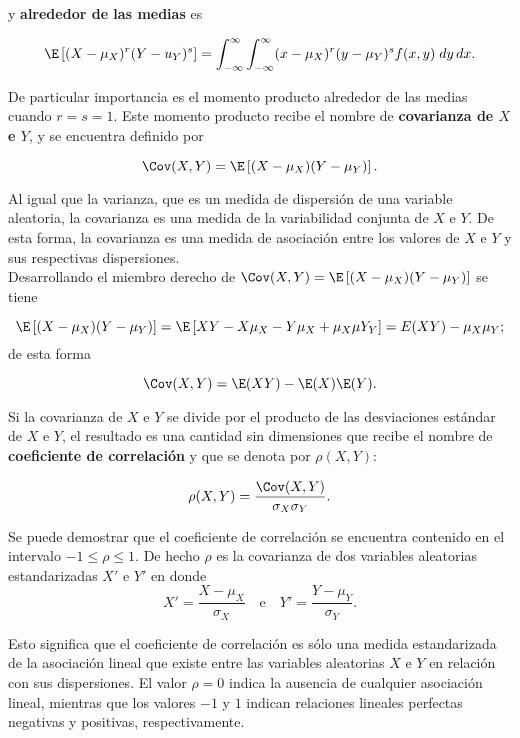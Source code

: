 y \textbf{alrededor de las medias} es
\begin{tcolorbox}
    $$\E\left[(X-\mu_X)^r(Y-u_Y)^s\right] = \int_{-\infty}^\infty \int_{-\infty}^\infty (x-\mu_X)^r (y-\mu_Y)^s f(x,y)\; dy\, dx.$$
\end{tcolorbox}

De particular importancia es el momento producto alrededor de las medias cuando $r=s=1$. Este momento producto recibe el nombre de \textbf{\boldmath covarianza de $X$ e $Y$}, y se encuentra definido por
\begin{tcolorbox}
    $$\Cov(X,Y) = \E\left[(X-\mu_X)(Y-\mu_Y)\right].$$
\end{tcolorbox}

Al igual que la varianza, que es un medida de dispersión de una variable aleatoria, la covarianza es una medida de la variabilidad conjunta de $X$ e $Y$. De esta forma, la covarianza es una medida de asociación entre los valores de $X$ e $Y$ y sus respectivas dispersiones.\\

Desarrollando el miembro derecho de $\Cov(X,Y) = \E\left[(X-\mu_X)(Y-\mu_Y)\right]$ se tiene

$$\E\left[(X-\mu_X)(Y-\mu_Y)\right]=\E\left[XY-X\mu_X - Y\mu_X + \mu_X \mu Y_Y\right] = E(XY)-\mu_X\mu_Y;$$
de esta forma
\begin{tcolorbox}
    $$\Cov(X,Y) = \E(XY)-\E(X)\E(Y).$$
\end{tcolorbox}

Si la covarianza de $X$ e $Y$ se divide por el producto de las desviaciones estándar de $X$ e $Y$, el resultado es una cantidad sin dimensiones que recibe el nombre de \textbf{coeficiente de correlación} y que se denota por $\rho(X,Y)$:

\begin{tcolorbox}
    $$\rho(X,Y)=\dfrac{\Cov(X,Y)}{\sigma_X \sigma_Y}.$$
\end{tcolorbox}

Se puede demostrar que el coeficiente de correlación se encuentra contenido en el intervalo $-1\leq \rho\leq 1.$ De hecho $\rho$ es la covarianza de dos variables aleatorias estandarizadas $X'$ e $Y'$ en donde 
$$X'=\dfrac{X-\mu_X}{\sigma_X} \quad \mbox{e} \quad Y'=\dfrac{Y-\mu_Y}{\sigma_Y}.$$

Esto significa que el coeficiente de correlación es sólo una medida estandarizada de la asociación lineal que existe entre las variables aleatorias $X$ e $Y$ en relación con sus dispersiones. El valor $\rho=0$ indica la ausencia de cualquier asociación lineal, mientras que los valores $-1$ y $1$ indican relaciones lineales perfectas negativas y positivas, respectivamente. 


